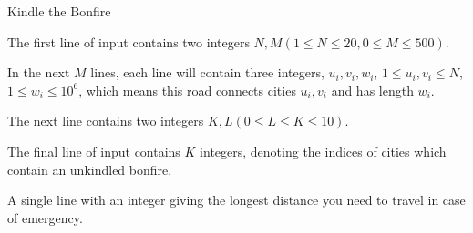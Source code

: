 \begin{problem}{Kindle the Bonfire}
\InputFile

The first line of input contains two integers $N, M (1 \le N \le 20,
0 \le M \le 500)$.

In the next $M$ lines, each line will contain three integers,
$u_i, v_i, w_i$, $1 \le u_i, v_i \le N$, $1 \le w_i \le 10^6$, which means
this road connects cities $u_i, v_i$ and has length $w_i$.

The next line contains two integers $K, L (0 \le L \le K \le 10)$. 

The final line of input contains $K$ integers, denoting the indices of cities
which contain an unkindled bonfire.
\OutputFile

A single line with an integer giving the longest distance you need to travel
in case of emergency.

\Examples

\begin{example}
%
%
\end{example}
\end{problem}
